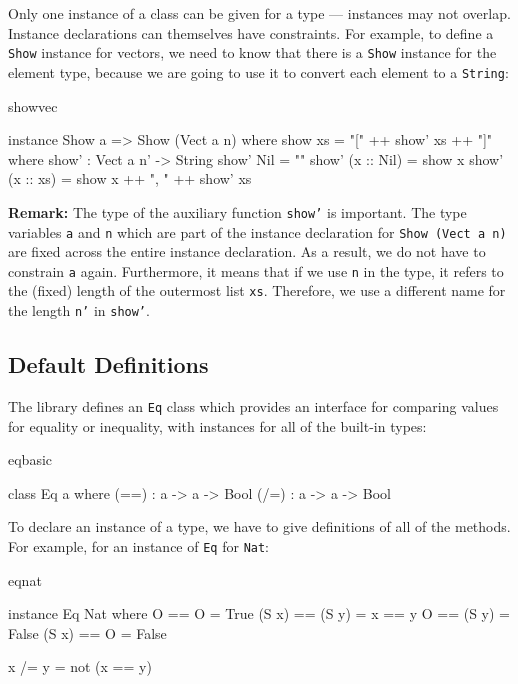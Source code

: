 \noindent
Only one instance of a class can be given for a type --- instances may not overlap.
Instance declarations can themselves have constraints. For example, to define a
\texttt{Show} instance for vectors, we need to know that there is a \texttt{Show} 
instance for the element type, because we are going to use it to convert each element
to a \texttt{String}:

\begin{SaveVerbatim}{showvec}

instance Show a => Show (Vect a n) where
    show xs = "[" ++ show' xs ++ "]" where
        show' : Vect a n' -> String
        show' Nil        = ""
        show' (x :: Nil) = show x
        show' (x :: xs)  = show x ++ ", " ++ show' xs

\end{SaveVerbatim}

\noindent
\textbf{Remark: } The type of the auxiliary function \texttt{show'} is
important. The type variables \texttt{a} and \texttt{n} which are part of the
instance declaration for \texttt{Show (Vect a n)} are fixed across the entire
instance declaration. As a result, we do not have to constrain \texttt{a}
again. Furthermore, it means that if we use \texttt{n} in the type, it refers
to the (fixed) length of the outermost list \texttt{xs}. Therefore,
we use a different name for the length \texttt{n'} in \texttt{show'}.

\subsection{Default Definitions}

The library defines an \texttt{Eq} class which provides an interface for comparing
values for equality or inequality, with instances for all of the built-in types:

\begin{SaveVerbatim}{eqbasic}

class Eq a where
    (==) : a -> a -> Bool
    (/=) : a -> a -> Bool

\end{SaveVerbatim}

\noindent
To declare an instance of a type, we have to give definitions of all of the methods.
For example, for an instance of \texttt{Eq} for \texttt{Nat}:

\begin{SaveVerbatim}{eqnat}

instance Eq Nat where
    O     == O     = True
    (S x) == (S y) = x == y
    O     == (S y) = False
    (S x) == O     = False

    x /= y = not (x == y)

\end{SaveVerbatim}

